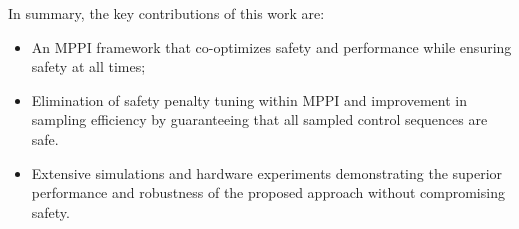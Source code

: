 In summary, the key contributions of this work are: 
% 
\begin{itemize}
  \item An MPPI framework that co-optimizes safety and performance while ensuring safety at all times;
  \item Elimination of safety penalty tuning within MPPI and improvement in sampling efficiency by guaranteeing that all sampled control sequences are safe.
  \item Extensive simulations and hardware experiments demonstrating the superior performance and robustness of the proposed approach without compromising safety.
\end{itemize}
